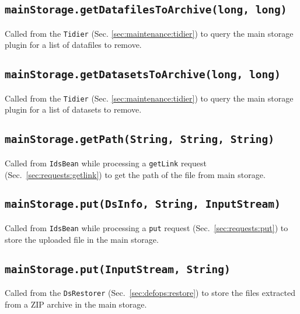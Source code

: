 \documentclass[paper=a4]{scrartcl}
\begin{document}
\subsection{\texttt{mainStorage.getDatafilesToArchive(long, long)}}

Called from the \texttt{Tidier} (Sec. \ref{sec:maintenance:tidier}) to
query the main storage plugin for a list of datafiles to remove.

\subsection{\texttt{mainStorage.getDatasetsToArchive(long, long)}}

Called from the \texttt{Tidier} (Sec. \ref{sec:maintenance:tidier}) to
query the main storage plugin for a list of datasets to remove.

\subsection{\texttt{mainStorage.getPath(String, String, String)}}

Called from \texttt{IdsBean} while processing a \texttt{getLink}
request (Sec.\ \ref{sec:requests:getlink}) to get the path of the file
from main storage.

\subsection{\texttt{mainStorage.put(DsInfo, String, InputStream)}}

Called from \texttt{IdsBean} while processing a \texttt{put} request
(Sec.\ \ref{sec:requests:put}) to store the uploaded file in the main
storage.

\subsection{\texttt{mainStorage.put(InputStream, String)}}

Called from the \texttt{DsRestorer} (Sec.\ \ref{sec:defops:restore})
to store the files extracted from a ZIP archive in the main storage.
\end{document}
